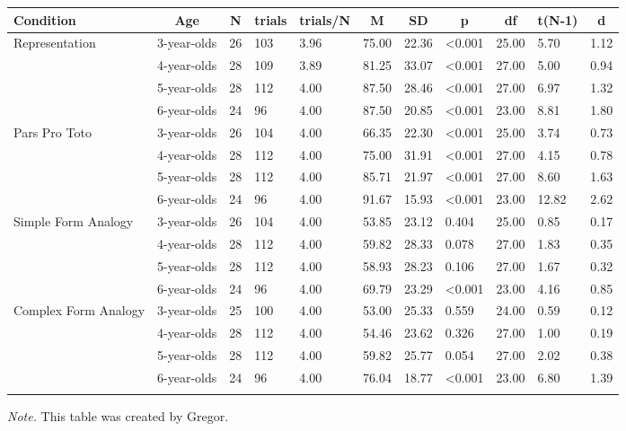 \documentclass[
  man]{apa6}
\begin{document}
\begin{landscape}
\begin{table}[tbp]
\begin{center}
\begin{threeparttable}
\begin{tabular}{lllllllllll}
\toprule
Condition & \multicolumn{1}{c}{Age} & \multicolumn{1}{c}{N} & \multicolumn{1}{c}{trials} & \multicolumn{1}{c}{trials/N} & \multicolumn{1}{c}{M} & \multicolumn{1}{c}{SD} & \multicolumn{1}{c}{p} & \multicolumn{1}{c}{df} & \multicolumn{1}{c}{t(N-1)} & \multicolumn{1}{c}{d}\\
\midrule
Representation & 3-year-olds & 26 & 103 & 3.96 & 75.00 & 22.36 & <0.001 & 25.00 & 5.70 & 1.12\\
 & 4-year-olds & 28 & 109 & 3.89 & 81.25 & 33.07 & <0.001 & 27.00 & 5.00 & 0.94\\
 & 5-year-olds & 28 & 112 & 4.00 & 87.50 & 28.46 & <0.001 & 27.00 & 6.97 & 1.32\\
 & 6-year-olds & 24 & 96 & 4.00 & 87.50 & 20.85 & <0.001 & 23.00 & 8.81 & 1.80\\
Pars Pro Toto & 3-year-olds & 26 & 104 & 4.00 & 66.35 & 22.30 & <0.001 & 25.00 & 3.74 & 0.73\\
 & 4-year-olds & 28 & 112 & 4.00 & 75.00 & 31.91 & <0.001 & 27.00 & 4.15 & 0.78\\
 & 5-year-olds & 28 & 112 & 4.00 & 85.71 & 21.97 & <0.001 & 27.00 & 8.60 & 1.63\\
 & 6-year-olds & 24 & 96 & 4.00 & 91.67 & 15.93 & <0.001 & 23.00 & 12.82 & 2.62\\
Simple Form Analogy & 3-year-olds & 26 & 104 & 4.00 & 53.85 & 23.12 & 0.404 & 25.00 & 0.85 & 0.17\\
 & 4-year-olds & 28 & 112 & 4.00 & 59.82 & 28.33 & 0.078 & 27.00 & 1.83 & 0.35\\
 & 5-year-olds & 28 & 112 & 4.00 & 58.93 & 28.23 & 0.106 & 27.00 & 1.67 & 0.32\\
 & 6-year-olds & 24 & 96 & 4.00 & 69.79 & 23.29 & <0.001 & 23.00 & 4.16 & 0.85\\
Complex Form Analogy & 3-year-olds & 25 & 100 & 4.00 & 53.00 & 25.33 & 0.559 & 24.00 & 0.59 & 0.12\\
 & 4-year-olds & 28 & 112 & 4.00 & 54.46 & 23.62 & 0.326 & 27.00 & 1.00 & 0.19\\
 & 5-year-olds & 28 & 112 & 4.00 & 59.82 & 25.77 & 0.054 & 27.00 & 2.02 & 0.38\\
 & 6-year-olds & 24 & 96 & 4.00 & 76.04 & 18.77 & <0.001 & 23.00 & 6.80 & 1.39\\
\bottomrule
\addlinespace
\end{tabular}

\begin{tablenotes}[para]
\normalsize{\textit{Note.} This table was created by Gregor.}
\end{tablenotes}


\end{threeparttable}
\end{center}
\end{table}
\end{landscape}
\end{document}
